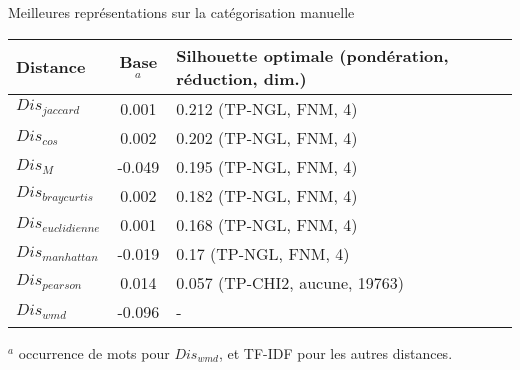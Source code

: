 \begin{frame}{\mysubsectiontitle}
	Meilleures représentations sur la catégorisation manuelle
\begin{table}[!htb]
	\scriptsize
	\begin{center}
		\begin{tabular}[pos]{|l|c|p{}|}
			\hline
			\textbf{Distance}&\textbf{Base$^a$}&\textbf{Silhouette optimale   (pondération, réduction, dim.)} \\ \hline
			$Dis_{jaccard}$ & 0.001 & 0.212 (TP-NGL, FNM, 4) \\ \hline
			$Dis_{cos}$ & 0.002 & 0.202 (TP-NGL, FNM, 4) \\ \hline
			$Dis_{M}$ & -0.049 & 0.195 (TP-NGL, FNM, 4) \\ \hline
			$Dis_{braycurtis}$ & 0.002& 0.182 (TP-NGL, FNM, 4) \\ \hline
			$Dis_{euclidienne}$ & 0.001& 0.168  (TP-NGL, FNM, 4) \\ \hline
			$Dis_{manhattan}$ & -0.019& 0.17   (TP-NGL, FNM, 4) \\ \hline
			$Dis_{pearson}$ & 0.014 & 0.057 (TP-CHI2, aucune, 19763) \\ \hline
			$Dis_{wmd}$ & -0.096 &  - \\ \hline
		\end{tabular}				
	\end{center}
	
	$^a$ occurrence de mots pour $Dis_{wmd}$, et TF-IDF pour les autres distances.
\end{table}
\end{frame}

